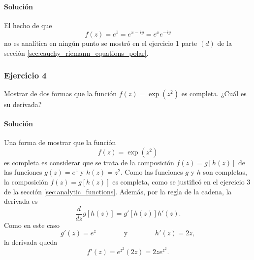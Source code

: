 \documentclass[a4paper]{report}
\begin{document}
\paragraph{Solución} El hecho de que 
\[
 f(z)=e^{\overline{z}}=e^{x-iy}=e^xe^{-iy}
\]
no es analítica en ningún punto se mostró en el ejercicio 1 parte \((d)\) de la sección \ref{sec:cauchy_riemann_equations_polar}.

\subsubsection{Ejercicio 4}

Mostrar de dos formas que la función \(f(z)=\exp(z^2)\) es completa. ¿Cuál es su derivada?

\paragraph{Solución} Una forma de mostrar que la función 
\[
 f(z)=\exp(z^2)
\]
es completa es considerar que se trata de la composición \(f(z)=g[h(z)]\) de las funciones \(g(z)=e^z\) y \(h(z)=z^2\). Como las funciones \(g\) y \(h\) son completas, la composición \(f(z)=g[h(z)]\) es completa, como se justificó en el ejercicio 3 de la sección \ref{sec:analytic_functions}. Además, por la regla de la cadena, la derivada es
\[
 \frac{d}{dz}g[h(z)]=g'[h(z)]h'(z).
\]
Como en este caso
\[
 g'(z)=e^z
 \qquad\qquad\textrm{y}\qquad\qquad
 h'(z)=2z,
\]
la derivada queda
\[
 f'(z)=e^{z^2}(2z)=2ze^{z^2}.
\]
\end{document}
